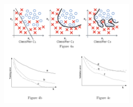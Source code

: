 \documentclass[a4paper,11pt,oneside]{book}
\begin{document}
\begin{enumerate}
        \begin{figure}[H]
            \centering
            \includegraphics[width=0.6\textwidth,height=0.4\textheight,keepaspectratio]{images/4_1_July_2019.png}
            \end{figure}
        \end{enumerate}
\end{document}
